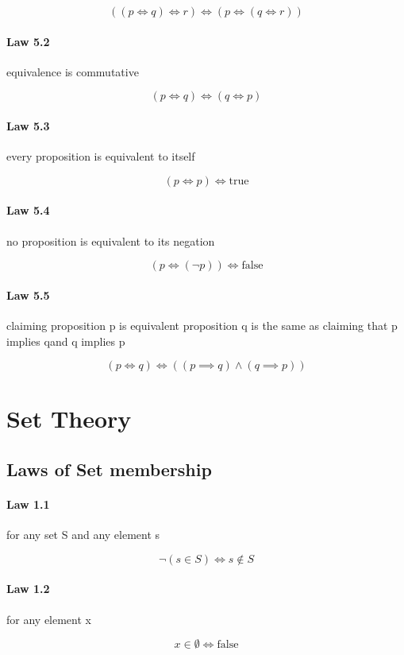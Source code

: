 \documentclass[twocolumn]{article}
\begin{document}
$$ ((p  \iff  q)  \iff  r)  \iff  (p  \iff  (q  \iff  r)) $$

\paragraph{Law 5.2} equivalence is commutative

$$ (p  \iff  q)  \iff  (q  \iff  p) $$

\paragraph{Law 5.3} every proposition is equivalent to itself

$$ (p  \iff  p)  \iff  \text{true} $$

\paragraph{Law 5.4} no proposition is equivalent to its negation

$$ (p  \iff  ( \neg p))  \iff  \text{false} $$

\paragraph{Law 5.5} claiming proposition p is equivalent proposition q is the same as claiming that p implies qand q implies p

$$ (p  \iff  q)  \iff  ((p  \implies   q)  \wedge  (q  \implies   p)) $$

\section{Set Theory}

\subsection{Laws of Set membership}

\paragraph{Law 1.1} for any set S and any element s

$$ \neg(s  \in  S) \iff s \not\in S $$

\paragraph{Law 1.2} for any element x

$$ x  \in   \emptyset  \iff \text{false} $$
\end{document}
